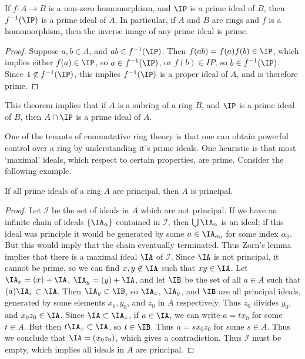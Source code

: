 \begin{theorem}
    If $f: A \to B$ is a non-zero homomorphism, and $\IP$ is a prime ideal of $B$, then $f^{-1}(\IP)$ is a prime ideal of $A$. In particular, if $A$ and $B$ are rings and $f$ is a homomorphism, then the inverse image of any prime ideal is prime.
\end{theorem}
\begin{proof}
    Suppose $a,b \in A$, and $ab \in f^{-1}(\IP)$. Then $f(ab) = f(a)f(b) \in \IP$, which implies either $f(a) \in \IP$, so $a \in f^{-1}(\IP)$, or $f(b) \in IP$, so $b \in f^{-1}(\IP)$. Since $1 \not \in f^{-1}(\IP)$, this implies $f^{-1}(\IP)$ is a proper ideal of $A$, and is therefore prime.
\end{proof}

\begin{remark}
    This theorem implies that if $A$ is a subring of a ring $B$, and $\IP$ is a prime ideal of $B$, then $A \cap \IP$ is a prime ideal of $A$.
\end{remark}

One of the tenants of commutative ring theory is that one can obtain powerful control over a ring by understanding it's prime ideals. One heuristic is that most `maximal' ideals, which respect to certain properties, are prime. Consider the following example.

\begin{theorem}
    If all prime ideals of a ring $A$ are principal, then $A$ is principal.
\end{theorem}
\begin{proof}
    Let $\mathcal{I}$ be the set of ideals in $A$ which are not principal. If we have an infinite chain of ideals $\{ \IA_\alpha \}$ contained in $\mathcal{I}$, then $\bigcup \IA_\alpha$ is an ideal; if this ideal was principle it would be generated by some $a \in \IA_{\alpha_0}$ for some index $\alpha_0$. But this would imply that the chain eventually terminated. Thus Zorn's lemma implies that there is a maximal ideal $\IA$ of $\mathcal{I}$. Since $\IA$ is not principal, it cannot be prime, so we can find $x,y \not \in \IA$ such that $xy \in \IA$. Let $\IA_x = (x) + \IA$, $\IA_y = (y) + \IA$, and let $\IB$ be the set of all $a \in A$ such that $(a) \IA_x \subset \IA$. Then $\IA_y \subset \IB$, so $\IA_x$, $\IA_y$, and $\IB$ are all principal ideals, generated by some elements $x_0,y_0$, and $z_0$ in $A$ respectively. Thus $z_0$ divides $y_0$, and $x_0z_0 \in \IA$. Since $\IA \subset \IA_x$, if $a \in \IA$, we can write $a = tx_0$ for some $t \in A$. But then $t\IA_x \subset \IA$, so $t \in \IB$. Thus $a = sx_0z_0$ for some $s \in A$. Thus we conclude that $\IA = (x_0z_0)$, which gives a contradiction. Thus $\mathcal{I}$ must be empty, which implies all ideals in $A$ are principal.
\end{proof}

